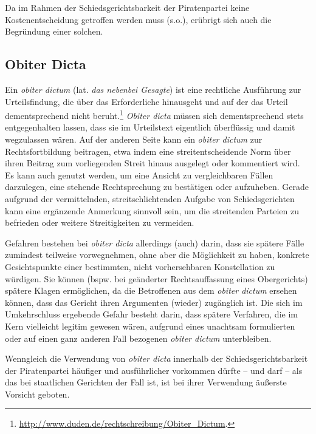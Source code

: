 Da im Rahmen der Schiedsgerichtsbarkeit der Piratenpartei keine Kostenentscheidung getroffen werden muss (s.o.), erübrigt sich auch die Begründung einer solchen.

\subsection{Obiter Dicta}
Ein \emph{obiter dictum} (lat. \emph{das nebenbei Gesagte}) ist eine rechtliche Ausführung zur Urteilsfindung, die über das Erforderliche hinausgeht und auf der das Urteil dementsprechend nicht beruht.\footnote{\url{http://www.duden.de/rechtschreibung/Obiter_Dictum}.} \emph{Obiter dicta} müssen sich dementsprechend stets entgegenhalten lassen, dass sie im Urteilstext eigentlich überflüssig und damit wegzulassen wären. Auf der anderen Seite kann ein \emph{obiter dictum} zur Rechtsfortbildung beitragen, etwa indem eine streitentscheidende Norm über ihren Beitrag zum vorliegenden Streit hinaus ausgelegt oder kommentiert wird. Es kann auch genutzt werden, um eine Ansicht zu vergleichbaren Fällen darzulegen, eine stehende Rechtsprechung zu bestätigen oder aufzuheben. Gerade aufgrund der vermittelnden, streitschlichtenden Aufgabe von Schiedsgerichten kann eine ergänzende Anmerkung sinnvoll sein, um die streitenden Parteien zu befrieden oder weitere Streitigkeiten  zu vermeiden.

Gefahren bestehen bei \emph{obiter dicta} allerdings (auch) darin, dass sie spätere Fälle zumindest teilweise vorwegnehmen, ohne aber die Möglichkeit zu haben, konkrete Gesichtspunkte einer bestimmten, nicht vorhersehbaren Konstellation zu würdigen. Sie können (bspw. bei geänderter Rechtsauffassung eines Obergerichts) spätere Klagen ermöglichen, da die Betroffenen aus dem \emph{obiter dictum} ersehen können, dass das Gericht ihren Argumenten (wieder) zugänglich ist. Die sich im Umkehrschluss ergebende Gefahr besteht darin, dass spätere Verfahren, die im Kern vielleicht legitim gewesen wären, aufgrund eines unachtsam formulierten oder auf einen ganz anderen Fall bezogenen \emph{obiter dictum} unterbleiben.

Wenngleich die Verwendung von \emph{obiter dicta} innerhalb der Schiedsgerichtsbarkeit der Piratenpartei häufiger und ausführlicher vorkommen dürfte – und darf – als das bei staatlichen Gerichten der Fall ist, ist bei ihrer Verwendung äußerste Vorsicht geboten.


